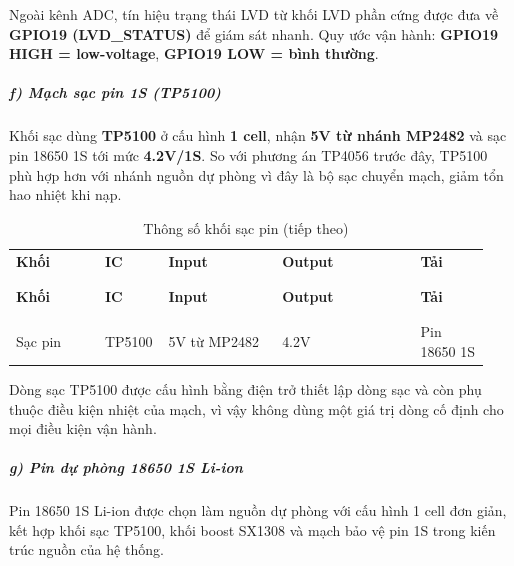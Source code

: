 \documentclass[a4paper]{extarticle}
\newcommand{\thesissettableid}[2]{%
  \renewcommand{\thetable}{#1}%
  \renewcommand{\theHtable}{#2}%
}
\begin{document}
Ngoài kênh ADC, tín hiệu trạng thái LVD từ khối LVD phần cứng được đưa về
\textbf{GPIO19 (LVD\_STATUS)} để giám sát nhanh. Quy ước vận hành:
\textbf{GPIO19 HIGH = low-voltage}, \textbf{GPIO19 LOW = bình thường}.

\subparagraph{f) Mạch sạc pin 1S
(TP5100)}\label{f-mux1ea1ch-sux1ea1c-pin-1s-tp4056}

Khối sạc dùng \textbf{TP5100} ở cấu hình \textbf{1 cell}, nhận
\textbf{5V từ nhánh MP2482} và sạc pin 18650 1S tới mức
\textbf{4.2V/1S}. So với phương án TP4056 trước đây, TP5100 phù hợp hơn
với nhánh nguồn dự phòng vì đây là bộ sạc chuyển mạch, giảm tổn hao
nhiệt khi nạp.


{\thesissettableid{3.13}{tab-ch3-thong-so-khoi-sac-pin}
\def\LTcaptype{table}
\begin{longtable}{|L{0.189\linewidth}|L{0.094\linewidth}|L{0.236\linewidth}|L{0.283\linewidth}|L{0.142\linewidth}|}
\caption{Thông số khối sạc pin}\label{tab:ch3-thong-so-khoi-sac-pin}\\
\hline \textbf{Khối} & \textbf{IC} & \textbf{Input} & \textbf{Output} & \textbf{Tải} \\
\\\hline
\endfirsthead
\caption[]{Thông số khối sạc pin (tiếp theo)}\\
\hline \textbf{Khối} & \textbf{IC} & \textbf{Input} & \textbf{Output} & \textbf{Tải} \\
\\\hline
\endhead
\\\hline
\endfoot
\endlastfoot
Sạc pin & TP5100 & 5V từ MP2482 & 4.2V & Pin 18650 1S \\\hline
\end{longtable}
}


Dòng sạc TP5100 được cấu hình bằng điện trở thiết lập dòng sạc và còn
phụ thuộc điều kiện nhiệt của mạch, vì vậy không dùng một giá trị dòng
cố định cho mọi điều kiện vận hành.

\subparagraph{g) Pin dự phòng 18650 1S
Li-ion}\label{g-pin-dux1ef1-phuxf2ng-18650-1s-li-ion}

Pin 18650 1S Li-ion được chọn làm nguồn dự phòng với cấu hình 1 cell đơn
giản, kết hợp khối sạc TP5100, khối boost SX1308 và mạch bảo vệ pin 1S
trong kiến trúc nguồn của hệ thống.
\end{document}
